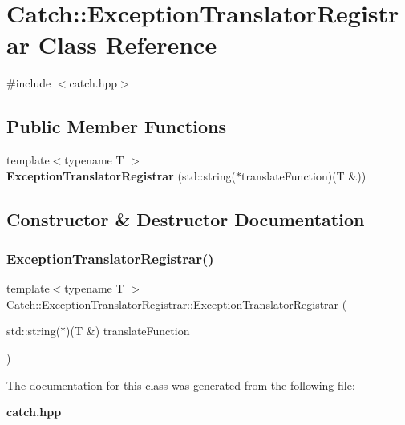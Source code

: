\section{Catch\+:\+:Exception\+Translator\+Registrar Class Reference}
\label{class_catch_1_1_exception_translator_registrar}


{\ttfamily \#include $<$catch.\+hpp$>$}

\subsection*{Public Member Functions}
\begin{DoxyCompactItemize}
\item 
{\footnotesize template$<$typename T $>$ }\\\textbf{ Exception\+Translator\+Registrar} (std\+::string($\ast$translate\+Function)(T \&))
\end{DoxyCompactItemize}


\subsection{Constructor \& Destructor Documentation}
\mbox{\label{class_catch_1_1_exception_translator_registrar_aa73229de911f26b1df6c6c87c4d9e04e}} 
\subsubsection{Exception\+Translator\+Registrar()}
{\footnotesize\ttfamily template$<$typename T $>$ \\
Catch\+::\+Exception\+Translator\+Registrar\+::\+Exception\+Translator\+Registrar (\begin{DoxyParamCaption}\item[{std\+::string($\ast$)(T \&)}]{translate\+Function }\end{DoxyParamCaption})\hspace{0.3cm}{\ttfamily [inline]}}



The documentation for this class was generated from the following file\+:\begin{DoxyCompactItemize}
\item 
\textbf{ catch.\+hpp}\end{DoxyCompactItemize}
